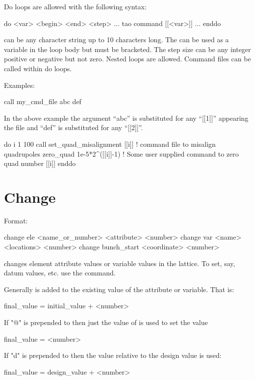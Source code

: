 Do loops are allowed with the following syntax:
\begin{example}
  do <var> <begin> <end> <step> 
    ...
    tao command [[<var>]]
    ...
  enddo
\end{example}
 can be any character string up to 10 characters long.
The  can be used as a variable in the loop body but must be
bracketed.  The step size can be any integer positive or negative but not zero.
Nested loops are allowed. Command files can be called within do loops.

Examples:
\begin{example}
    call my_cmd_file abc def 
\end{example}
In the above example the argument ``abc'' is substituted for any
``[[1]]'' appearing the file and ``def'' is substituted for any
``[[2]]''.
\Newline

\begin{example}
  do i 1 100
    call set_quad_misalignment [[i]] ! command file to misalign quadrupoles
    zero_quad 1e-5*2^([[i]]-1) ! Some user supplied command to zero quad number [[i]]
  enddo
\end{example}

\section{Change}
\label{s:change}

Format:
\begin{example}
  change ele <name_or_number> <attribute> <number>
  change var <name> <locations> <number>
  change bunch_start <coordinate> <number>
\end{example}

\vskip 0.2in 
 changes element attribute values or variable
values in the  lattice. To set, say, datum values, etc. use
the  command.

Generally  is added to the existing value of the
attribute or variable. That is:
\begin{example}
  final_value = initial_value + <number>
\end{example}
If "@" is prepended to  then just the value of
 is used to set the value
\begin{example}
  final_value = <number>
\end{example}
If "d" is prepended to  then the value relative to the design
value is used:
\begin{example}
  final_value = design_value + <number>
\end{example}

